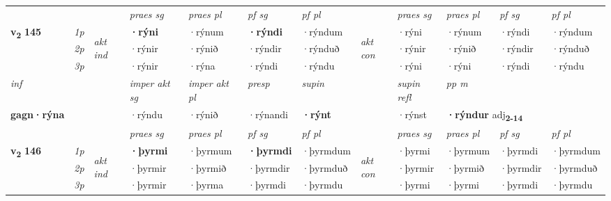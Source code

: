 \begin{longtable}[l]{X>{\footnotesize\itshape}llXXXXlXXXX}
 & &   & \textit{praes sg}  & \textit{praes pl}    & \textit{ pf sg} & \textit{pf pl} & & \textit{praes sg}  & \textit{praes pl}    & \textit{pf sg} & \textit{pf pl }  \\ \cmidrule{4-7} \cmidrule{9-12}
 \multirow{2}{*}{{{\textbf{v{\textsubscript{2}}} \Large{\textbf{145}}}}}  & 1p & \multirow{3}{*}{\begin{turn}{90}\textit{akt ind}\end{turn}} & \textbf{·rýni} & ·rýnum & \textbf{·rýndi} & ·rýndum & \multirow{3}{*}{\begin{turn}{90}\textit{akt con}\end{turn}} &·rýni & ·rýnum & ·rýndi & ·rýndum\\*
 & 2p &  &  ·rýnir  & ·rýnið & ·rýndir & ·rýnduð & & ·rýnir & ·rýnið & ·rýndir & ·rýnduð \\*
 & 3p &  & ·rýnir & ·rýna & ·rýndi & ·rýndu & & ·rýni & ·rýni& ·rýndi & ·rýndu \\*
\cmidrule{4-7} \cmidrule{9-12}

   {\textit{inf}} & &  & \textit{imper akt sg} & \textit{imper akt pl}   & \textit{presp} & \textit{supin} && \textit{supin refl} & \textit{pp m} \\*
  {\textbf{gagn\allowbreak ·rýna}} & && ·rýndu  & ·rýnið   & ·rýnandi &  \textbf{·rýnt} && ·rýnst & \multicolumn{2}{l}{\textbf{·rýndur} adj\textbf{\textsubscript{2-14}}} \\*

\midrule

 & &   & \textit{praes sg}  & \textit{praes pl}    & \textit{ pf sg} & \textit{pf pl} & & \textit{praes sg}  & \textit{praes pl}    & \textit{pf sg} & \textit{pf pl }  \\ \cmidrule{4-7} \cmidrule{9-12}
 \multirow{2}{*}{{{\textbf{v{\textsubscript{2}}} \Large{\textbf{146}}}}}  & 1p & \multirow{3}{*}{\begin{turn}{90}\textit{akt ind}\end{turn}} & \textbf{·þyrmi} & ·þyrmum & \textbf{·þyrmdi} & ·þyrmdum & \multirow{3}{*}{\begin{turn}{90}\textit{akt con}\end{turn}} &·þyrmi & ·þyrmum & ·þyrmdi & ·þyrmdum\\*
 & 2p &  &  ·þyrmir  & ·þyrmið & ·þyrmdir & ·þyrmduð & & ·þyrmir & ·þyrmið & ·þyrmdir & ·þyrmduð \\*
 & 3p &  & ·þyrmir & ·þyrma & ·þyrmdi & ·þyrmdu & & ·þyrmi & ·þyrmi& ·þyrmdi & ·þyrmdu \\*
\cmidrule{4-7} \cmidrule{9-12}


\end{longtable}
